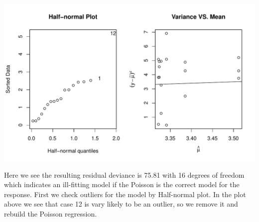 \documentclass[12pt,oneside,a4paper]{article}\usepackage[]{graphicx}\usepackage[]{xcolor}
\newenvironment{knitrout}{}{} %
\begin{document}
\begin{knitrout}
{\centering \includegraphics[width=1\linewidth]{figure/p2_1-1} 

}



\end{knitrout}

Here we see the resulting residual deviance is 75.81 with 16 degrees of freedom which indicates an ill-fitting model if the Poisson is the correct model for the response. First we check outliers for the model by Half-normal plot. In the plot above we see that case 12 is vary likely to be an outlier, so we remove it and rebuild the Poisson regression.
\end{document}
